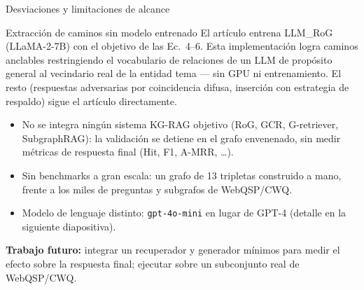 \documentclass[aspectratio=169]{beamer}
\begin{document}
\begin{frame}{Desviaciones y limitaciones de alcance}
  \small
  \begin{block}{Extracción de caminos sin modelo entrenado}
    El artículo entrena LLM\_RoG (LLaMA-2-7B) con el objetivo de las Ec.~4--6.
    Esta implementación logra caminos anclables restringiendo el vocabulario de
    relaciones de un LLM de propósito general al vecindario real de la entidad
    tema --- sin GPU ni entrenamiento. El resto (respuestas adversarias por
    coincidencia difusa, inserción con estrategia de respaldo) sigue el
    artículo directamente.
  \end{block}
  \begin{itemize}
    \item No se integra ningún sistema KG-RAG objetivo (RoG, GCR, G-retriever,
      SubgraphRAG): la validación se detiene en el grafo envenenado, sin medir
      métricas de respuesta final (Hit, F1, A-MRR, \dots).
    \item Sin benchmarks a gran escala: un grafo de 13 tripletas construido a
      mano, frente a los miles de preguntas y subgrafos de WebQSP/CWQ.
    \item Modelo de lenguaje distinto: \texttt{gpt-4o-mini} en lugar de GPT-4
      (detalle en la siguiente diapositiva).
  \end{itemize}
  \vspace{0.5em}
  \textbf{Trabajo futuro:} integrar un recuperador y generador mínimos para
  medir el efecto sobre la respuesta final; ejecutar sobre un subconjunto real
  de WebQSP/CWQ.
\end{frame}
\end{document}
